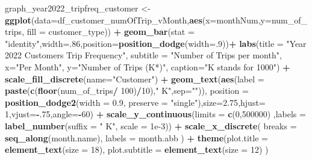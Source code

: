 \documentclass[
]{article}
\newenvironment{Shaded}{\begin{snugshade}}{\end{snugshade}}
\newcommand{\AttributeTok}[1]{\textcolor[rgb]{0.13,0.29,0.53}{#1}}
\newcommand{\DecValTok}[1]{\textcolor[rgb]{0.00,0.00,0.81}{#1}}
\newcommand{\FloatTok}[1]{\textcolor[rgb]{0.00,0.00,0.81}{#1}}
\newcommand{\FunctionTok}[1]{\textcolor[rgb]{0.13,0.29,0.53}{\textbf{#1}}}
\newcommand{\NormalTok}[1]{#1}
\newcommand{\OtherTok}[1]{\textcolor[rgb]{0.56,0.35,0.01}{#1}}
\newcommand{\SpecialCharTok}[1]{\textcolor[rgb]{0.81,0.36,0.00}{\textbf{#1}}}
\newcommand{\StringTok}[1]{\textcolor[rgb]{0.31,0.60,0.02}{#1}}
\begin{document}
\begin{Shaded}
\begin{Highlighting}[]
\NormalTok{graph\_year2022\_tripfreq\_customer }\OtherTok{\textless{}{-}} \FunctionTok{ggplot}\NormalTok{(}\AttributeTok{data=}\NormalTok{df\_customer\_numOfTrip\_vMonth,}\FunctionTok{aes}\NormalTok{(}\AttributeTok{x=}\NormalTok{monthNum,}\AttributeTok{y=}\NormalTok{num\_of\_trips, }\AttributeTok{fill =}\NormalTok{ customer\_type)) }\SpecialCharTok{+}
  \FunctionTok{geom\_bar}\NormalTok{(}\AttributeTok{stat =} \StringTok{"identity"}\NormalTok{,}\AttributeTok{width=}\NormalTok{.}\DecValTok{86}\NormalTok{,}\AttributeTok{position=}\FunctionTok{position\_dodge}\NormalTok{(}\AttributeTok{width=}\NormalTok{.}\DecValTok{9}\NormalTok{))}\SpecialCharTok{+}
  \FunctionTok{labs}\NormalTok{(}\AttributeTok{title =} \StringTok{"Year 2022 Customers\textquotesingle{} Trip Frequency"}\NormalTok{,}
       \AttributeTok{subtitle =} \StringTok{"Number of Trips per month"}\NormalTok{,}
       \AttributeTok{x=}\StringTok{"Per Month"}\NormalTok{,}
       \AttributeTok{y=}\StringTok{"Number of Trips (K*)"}\NormalTok{,}
       \AttributeTok{caption=}\StringTok{"K stands for 1000"}\NormalTok{) }\SpecialCharTok{+}
  \FunctionTok{scale\_fill\_discrete}\NormalTok{(}\AttributeTok{name=}\StringTok{"Customer"}\NormalTok{) }\SpecialCharTok{+}
  \FunctionTok{geom\_text}\NormalTok{(}\FunctionTok{aes}\NormalTok{(}\AttributeTok{label =} \FunctionTok{paste}\NormalTok{(}\FunctionTok{c}\NormalTok{(}\FunctionTok{floor}\NormalTok{(num\_of\_trips}\SpecialCharTok{/} \DecValTok{100}\NormalTok{)}\SpecialCharTok{/}\DecValTok{10}\NormalTok{),}\StringTok{" K"}\NormalTok{,}\AttributeTok{sep=}\StringTok{""}\NormalTok{)),}
            \AttributeTok{position =} \FunctionTok{position\_dodge2}\NormalTok{(}\AttributeTok{width =} \FloatTok{0.9}\NormalTok{, }\AttributeTok{preserve =} \StringTok{"single"}\NormalTok{),}\AttributeTok{size=}\FloatTok{2.75}\NormalTok{,}\AttributeTok{hjust=} \DecValTok{1}\NormalTok{,}\AttributeTok{vjust=}\SpecialCharTok{{-}}\NormalTok{.}\DecValTok{75}\NormalTok{,}\AttributeTok{angle=}\SpecialCharTok{{-}}\DecValTok{60}\NormalTok{) }\SpecialCharTok{+}
  \FunctionTok{scale\_y\_continuous}\NormalTok{(}\AttributeTok{limits =} \FunctionTok{c}\NormalTok{(}\DecValTok{0}\NormalTok{,}\DecValTok{500000}\NormalTok{) ,}\AttributeTok{labels =} \FunctionTok{label\_number}\NormalTok{(}\AttributeTok{suffix =} \StringTok{" K"}\NormalTok{, }\AttributeTok{scale =} \FloatTok{1e{-}3}\NormalTok{)) }\SpecialCharTok{+}
  \FunctionTok{scale\_x\_discrete}\NormalTok{(}
    \AttributeTok{breaks =} \FunctionTok{seq\_along}\NormalTok{(month.name), }
    \AttributeTok{labels =}\NormalTok{ month.abb}
\NormalTok{  )  }\SpecialCharTok{+}
  \FunctionTok{theme}\NormalTok{(}\AttributeTok{plot.title =} \FunctionTok{element\_text}\NormalTok{(}\AttributeTok{size =} \DecValTok{18}\NormalTok{),}
        \AttributeTok{plot.subtitle =} \FunctionTok{element\_text}\NormalTok{(}\AttributeTok{size =} \DecValTok{12}\NormalTok{)}
\NormalTok{  )}
\end{Highlighting}
\end{Shaded}
\end{document}
